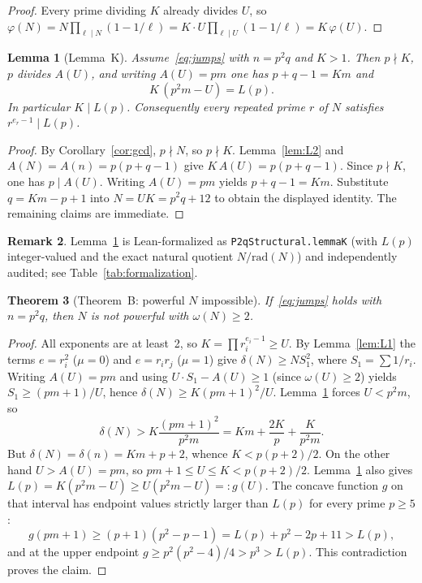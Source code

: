 \documentclass[11pt,reqno]{amsart}
\newcommand{\ph}{\varphi}
\newtheorem{theorem}{Theorem}
\newtheorem{lemma}[theorem]{Lemma}
\theoremstyle{definition}
\newtheorem{remark}[theorem]{Remark}
\begin{document}
\begin{proof}
Every prime dividing \(K\) already divides \(U\), so \(\ph(N)=N\prod_{\ell\mid N}(1-1/\ell)=K\cdot U\prod_{\ell\mid U}(1-1/\ell)=K\,\ph(U)\).
\end{proof}

\begin{lemma}[Lemma~K]
\label{lem:K}
Assume~\eqref{eq:jumps} with \(n=p^2q\) and \(K>1\). Then \(p\nmid K\), \(p\) divides \(A(U)\), and writing \(A(U)=pm\) one has \(p+q-1=Km\) and
\[
K\,(p^2m-U)=L(p).
\]
In particular \(K\mid L(p)\). Consequently every repeated prime \(r\) of \(N\) satisfies \(r^{e_r-1}\mid L(p)\).
\end{lemma}

\begin{proof}
By Corollary~\ref{cor:gcd}, \(p\nmid N\), so \(p\nmid K\). Lemma~\ref{lem:L2} and \(A(N)=A(n)=p(p+q-1)\) give \(K\,A(U)=p(p+q-1)\). Since \(p\nmid K\), one has \(p\mid A(U)\). Writing \(A(U)=pm\) yields \(p+q-1=Km\). Substitute \(q=Km-p+1\) into \(N=UK=p^2q+12\) to obtain the displayed identity. The remaining claims are immediate.
\end{proof}

\begin{remark}
Lemma~\ref{lem:K} is Lean-formalized as \texttt{P2qStructural.lemmaK} (with \(L(p)\) integer-valued and the exact natural quotient \(N/\mathrm{rad}(N)\)) and independently audited; see Table~\ref{tab:formalization}.
\end{remark}

\begin{theorem}[Theorem~B: powerful \(N\) impossible]
\label{thm:B}
If~\eqref{eq:jumps} holds with \(n=p^2q\), then \(N\) is not powerful with \(\omega(N)\ge 2\).
\end{theorem}

\begin{proof}
All exponents are at least~2, so \(K=\prod r_i^{e_i-1}\ge U\). By Lemma~\ref{lem:L1} the terms \(e=r_i^2\) (\(\mu=0\)) and \(e=r_ir_j\) (\(\mu=1\)) give \(\delta(N)\ge N S_1^2\), where \(S_1=\sum 1/r_i\). Writing \(A(U)=pm\) and using \(U\cdot S_1-A(U)\ge 1\) (since \(\omega(U)\ge 2\)) yields \(S_1\ge(pm+1)/U\), hence \(\delta(N)\ge K(pm+1)^2/U\). Lemma~\ref{lem:K} forces \(U<p^2m\), so
\[
\delta(N)>K\frac{(pm+1)^2}{p^2m}=Km+\frac{2K}{p}+\frac{K}{p^2m}.
\]
But \(\delta(N)=\delta(n)=Km+p+2\), whence \(K<p(p+2)/2\). On the other hand \(U>A(U)=pm\), so \(pm+1\le U\le K<p(p+2)/2\). Lemma~\ref{lem:K} also gives \(L(p)=K(p^2m-U)\ge U(p^2m-U)=:g(U)\). The concave function \(g\) on that interval has endpoint values strictly larger than \(L(p)\) for every prime \(p\ge 5\):
\[
g(pm+1)\ge(p+1)(p^2-p-1)=L(p)+p^2-2p+11>L(p),
\]
and at the upper endpoint \(g\ge p^2(p^2-4)/4>p^3>L(p)\). This contradiction proves the claim.
\end{proof}
\end{document}
